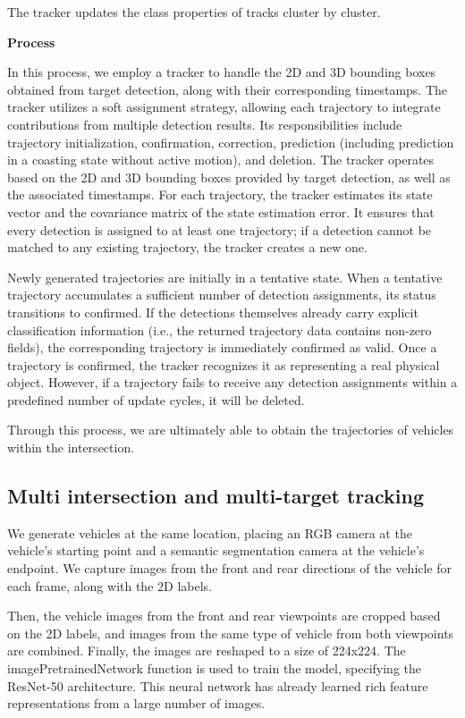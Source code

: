 The tracker updates the class properties of tracks cluster by cluster.


\textbf{Process}

In this process, we employ a tracker to handle the 2D and 3D bounding boxes obtained from target detection, along with their corresponding timestamps. 
The tracker utilizes a soft assignment strategy, allowing each trajectory to integrate contributions from multiple detection results. 
Its responsibilities include trajectory initialization, confirmation, correction, prediction (including prediction in a coasting state without active motion), and deletion. 
The tracker operates based on the 2D and 3D bounding boxes provided by target detection, as well as the associated timestamps. 
For each trajectory, the tracker estimates its state vector and the covariance matrix of the state estimation error. 
It ensures that every detection is assigned to at least one trajectory; if a detection cannot be matched to any existing trajectory, the tracker creates a new one.

Newly generated trajectories are initially in a tentative state. 
When a tentative trajectory accumulates a sufficient number of detection assignments, its status transitions to confirmed. 
If the detections themselves already carry explicit classification information (i.e., the returned trajectory data contains non-zero fields), the corresponding trajectory is immediately confirmed as valid. 
Once a trajectory is confirmed, the tracker recognizes it as representing a real physical object. 
However, if a trajectory fails to receive any detection assignments within a predefined number of update cycles, it will be deleted.

Through this process, we are ultimately able to obtain the trajectories of vehicles within the intersection.


\subsection{Multi intersection and multi-target tracking}

We generate vehicles at the same location, placing an RGB camera at the vehicle's starting point and a semantic segmentation camera at the vehicle's endpoint.
We capture images from the front and rear directions of the vehicle for each frame, along with the 2D labels.
 
Then, the vehicle images from the front and rear viewpoints are cropped based on the 2D labels, and images from the same type of vehicle from both viewpoints are combined. Finally, the images are reshaped to a size of 224x224.
The imagePretrainedNetwork function is used to train the model, specifying the ResNet-50 architecture. 
This neural network has already learned rich feature representations from a large number of images.

